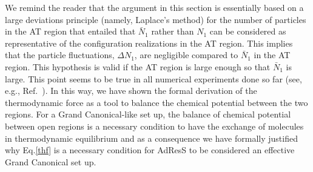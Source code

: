 \documentclass[aip,jcp,a4paper,reprint,onecolumn]{revtex4-1}
\begin{document}
We remind the reader that the argument in this section is essentially based on a large deviations principle (namely, Laplace's method) for the number of particles in the AT region that entailed that $\bar N_{1}$ rather than $N_{1}$ can be considered as representative of the configuration realizations in the AT region. This implies that the particle fluctuations, $\Delta N_{1}$,
are negligible compared to $\bar N_{1}$ in the AT region. This hypothesis is valid if the AT region is large enough so that $\bar N_{1}$ is large. This point seems to be true in all numerical experiments done so far (see, e.g., Ref.~). In this way, we have shown the formal derivation of the thermodynamic force as a tool to balance the chemical potential between the two regions. For a Grand Canonical-like set up, the balance of chemical potential between open regions is a necessary condition to have the exchange of molecules in thermodynamic equilibrium and as a consequence we have formally justified why Eq.\ref{thf} is a necessary condition for AdResS to be considered an effective Grand Canonical set up.
\end{document}
